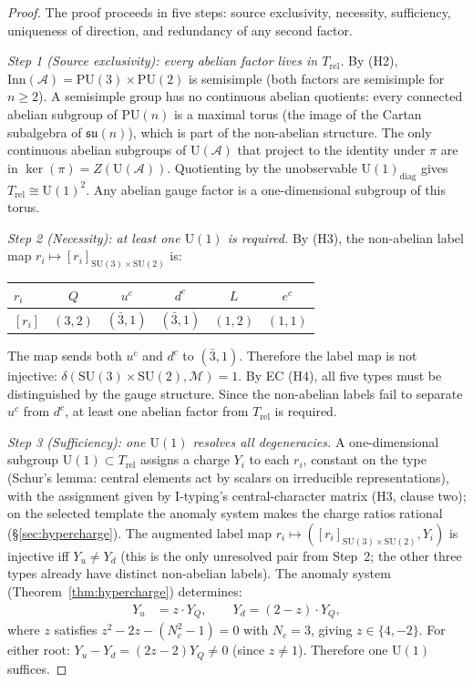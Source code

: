 \documentclass[11pt]{article}
\theoremstyle{definition}
\newcommand{\SU}{\mathrm{SU}}
\newcommand{\U}{\mathrm{U}}
\begin{document}
\begin{proof}
The proof proceeds in five steps: source exclusivity, necessity,
sufficiency, uniqueness of direction, and redundancy of any second
factor.

\textit{Step 1 (Source exclusivity): every abelian factor lives in
$T_{\mathrm{rel}}$.}\quad
By (H2), $\mathrm{Inn}(\mathcal{A}) = \mathrm{PU}(3) \times
\mathrm{PU}(2)$ is semisimple (both factors are semisimple for
$n \ge 2$).  A semisimple group has no continuous abelian
quotients: every connected abelian subgroup of $\mathrm{PU}(n)$ is
a maximal torus (the image of the Cartan subalgebra of
$\mathfrak{su}(n)$), which is part of the non-abelian structure.
The only continuous abelian subgroups of $\mathrm{U}(\mathcal{A})$
that project to the identity under $\pi$ are in $\ker(\pi) =
Z(\mathrm{U}(\mathcal{A}))$.  Quotienting by the unobservable
$\mathrm{U}(1)_{\mathrm{diag}}$ gives $T_{\mathrm{rel}} \cong
\mathrm{U}(1)^2$.  Any abelian gauge factor is a one-dimensional
subgroup of this torus.

\textit{Step 2 (Necessity): at least one $\U(1)$ is required.}\quad
By (H3), the non-abelian label map
$r_i \mapsto [r_i]_{\SU(3) \times \SU(2)}$ is:
\begin{center}\small
\begin{tabular}{@{}lccccc@{}}
\toprule
$r_i$ & $Q$ & $u^c$ & $d^c$ & $L$ & $e^c$ \\
\midrule
$[r_i]$ & $(3,2)$ & $(\bar{3},1)$ & $(\bar{3},1)$ & $(1,2)$ & $(1,1)$ \\
\bottomrule
\end{tabular}
\end{center}
The map sends both $u^c$ and $d^c$ to $(\bar{3}, 1)$.  Therefore
the label map is not injective: $\delta(\SU(3) \times \SU(2),
\mathcal{M}) = 1$.  By EC (H4), all five types must be
distinguished by the gauge structure.  Since the non-abelian
labels fail to separate $u^c$ from $d^c$, at least one abelian
factor from $T_{\mathrm{rel}}$ is required.

\textit{Step 3 (Sufficiency): one $\U(1)$ resolves all
degeneracies.}\quad
A one-dimensional subgroup $\U(1) \subset T_{\mathrm{rel}}$ assigns a
charge $Y_i$ to each $r_i$, constant on the type (Schur's lemma:
central elements act by scalars on irreducible representations), with
the assignment given by I-typing's central-character matrix (H3,
clause two); on the selected template the anomaly system makes the
charge ratios rational (\S\ref{sec:hypercharge}).  The
augmented label map $r_i \mapsto ([r_i]_{\SU(3) \times \SU(2)},
Y_i)$ is injective iff $Y_u \ne Y_d$ (this is the only
unresolved pair from Step~2; the other three types already have
distinct non-abelian labels).  The anomaly system
(Theorem~\ref{thm:hypercharge}) determines:
\begin{align*}
  Y_u &= z \cdot Y_Q, \qquad Y_d = (2 - z) \cdot Y_Q,
\end{align*}
where $z$ satisfies $z^2 - 2z - (N_c^2 - 1) = 0$ with $N_c = 3$,
giving $z \in \{4, -2\}$.  For either root:
$Y_u - Y_d = (2z - 2) Y_Q \ne 0$ (since $z \ne 1$).
Therefore one $\U(1)$ suffices.


\end{proof}
\end{document}

